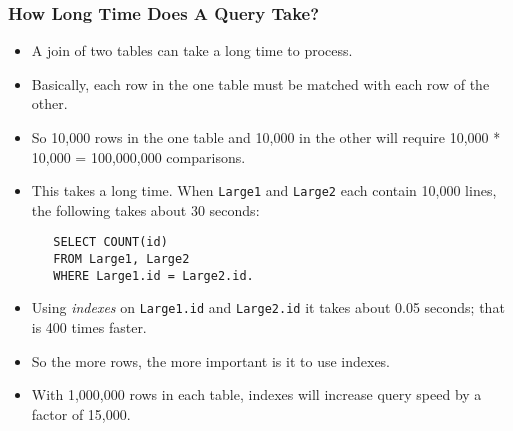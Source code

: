\documentclass[dvipsnames]{beamer}
\begin{document}
\begin{frame}[fragile=singleslide]
\frametitle{How Long Time Does A Query Take?}

\begin{itemize}
\item A join of two tables can take a long time to process.

\item Basically, each row in the one table must be matched with each
 row of the other.

\item So 10,000 rows in the one table and 10,000 in the
  other will require 10,000 * 10,000 = 100,000,000 comparisons.

\item This takes a long time.  When \texttt{Large1} and
  \texttt{Large2} each contain 10,000 lines, the following takes about
  30 seconds:
\begin{small}
\begin{verbatim}
   SELECT COUNT(id) 
   FROM Large1, Large2 
   WHERE Large1.id = Large2.id.
\end{verbatim}
\end{small}
  
\item Using \emph{indexes} on \texttt{Large1.id} and
  \texttt{Large2.id} it takes about 0.05 seconds; that is 400 times faster.

\item So the more rows, the more important is it to use indexes.
  
\item With 1,000,000 rows in each table, indexes will increase
  query speed by a factor of 15,000.
\end{itemize}
\end{frame}
\end{document}
